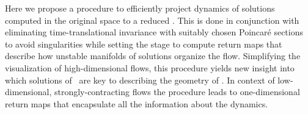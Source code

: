 Here we propose a procedure to efficiently project dynamics of
solutions computed in the original space to a reduced \statesp.
This is done in conjunction with eliminating time-translational
invariance with suitably chosen Poincar\'e sections to avoid
singularities while setting the stage to compute return maps
that describe how unstable manifolds of solutions organize the
flow. Simplifying the visualization of high-dimensional flows,
this procedure yields new insight into which solutions of \KSe\
are key to describing the geometry of \statesp. In context of
low-dimensional, strongly-contracting flows the procedure leads
to one-dimensional return maps that encapsulate all the
information about the dynamics.
